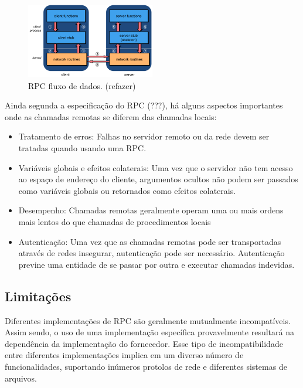 \begin{figure}
\centering
\includegraphics[width=0.5\textwidth]{figuras/How-RPC-Works.png}
\caption{RPC fluxo de dados. (refazer)}
\label{fig:rpc}
\end{figure}

Ainda segunda a especificação do RPC \cite{rfc1831:rpc}(???), há alguns aspectos importantes onde as chamadas remotas se diferem das chamadas locais:

\begin{itemize}
\item Tratamento de erros: Falhas no servidor remoto ou da rede devem ser tratadas quando usando uma RPC.

\item Variáveis globais e efeitos colaterais: Uma vez que o servidor não tem acesso ao espaço de endereço do cliente, argumentos ocultos não podem ser passados como variáveis globais ou retornados como efeitos colaterais.

\item Desempenho: Chamadas remotas geralmente operam uma ou mais ordens mais lentos do que chamadas de procedimentos locais

\item Autenticação: Uma vez que as chamadas remotas pode ser transportadas através de redes insegurar, autenticação pode ser necessário. Autenticação previne uma entidade de se passar por outra e executar chamadas indevidas.

\end{itemize}

\subsection{Limitações}

Diferentes implementações de RPC são geralmente mutualmente incompatíveis. Assim sendo, o uso de uma implementação específica provavelmente resultará na dependência da implementação do fornecedor. Esse tipo de incompatibilidade entre diferentes implementações implica em um diverso número de funcionalidades, suportando inúmeros protolos de rede e diferentes sistemas de arquivos.

